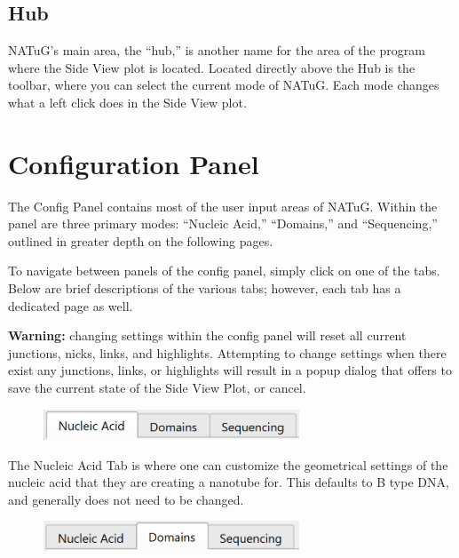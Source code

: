 \documentclass[titlepage]{article}
\begin{document}
	\subsection{Hub}
	NATuG’s main area, the “hub,” is another name for the area of the program where the Side View plot is located. Located directly above the Hub is the toolbar, where you can select the current mode of NATuG. Each mode changes what a left click does in the Side View plot.
	
	\section{Configuration Panel} \label{section:config-panel}
	The Config Panel contains most of the user input areas of NATuG. Within the panel are three primary modes: “Nucleic Acid,” “Domains,” and “Sequencing,” outlined in greater depth on the following pages. 
	
	To navigate between panels of the config panel, simply click on one of the tabs. Below are brief descriptions of the various tabs; however, each tab has a dedicated page as well.
	
	\textbf{Warning:} changing settings within the config panel will reset all current junctions, nicks, links, and highlights. Attempting to change settings when there exist any junctions, links, or highlights will result in a popup dialog that offers to save the current state of the Side View Plot, or cancel.
	
	\begin{figure}[h]
		\centering
		\includegraphics[width=3in]{"nucleic-acid-tab-activated.png"}
		\label{fig:nucleic-acid-tab-activated}
	\end{figure}

	The Nucleic Acid Tab is where one can customize the geometrical settings of the nucleic acid that they are creating a nanotube for. This defaults to B type DNA, and generally does not need to be changed. 

	\begin{figure}[h]
		\centering
		\includegraphics[width=3in]{"domains-tab-activated.png"}
		\label{fig:domains-tab-activated}
	\end{figure}
\end{document}
